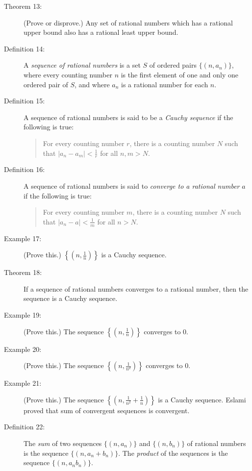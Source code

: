 \documentclass{article}
\begin{document}
\begin{description}
  \item[Theorem 13:] (Prove or disprove.) Any set of rational numbers which has a rational upper bound also has a rational least upper bound. 

  \item[Definition 14:] A \emph{sequence of rational numbers} is a set $S$ of ordered pairs $\{ (n, a_{n}) \}$, where every counting number $n$ is the first element of one and only one ordered pair of $S$, and where $a_{n}$ is a rational number for each $n$.

  \item[Definition 15:] A sequence of rational numbers is said to be a \emph{Cauchy sequence} if the following is true: 
    \begin{quote}
    For every counting number $r$, there is a counting number $N$ such that $|a_{n}-a_{m}| < \frac{1}{r}$ for all $n,m > N$.
    \end{quote}

  \item[Definition 16:] A sequence of rational numbers is said to \emph{converge to a rational number} $a$ if the following is true: 
    \begin{quote}
    For every counting number $m$, there is a counting number $N$ such that $|a_{n}-a| < \frac{1}{m}$ for all $n > N$.
    \end{quote}

  \item[Example 17:] (Prove this.) $\left\{ \left( n, \frac{1}{n} \right) \right\}$ is a Cauchy sequence. 

  \item[Theorem 18:] If a sequence of rational numbers converges to a rational number, then the sequence is a Cauchy sequence. 

  \item[Example 19:] (Prove this.) The sequence $\left\{ \left( n, \frac{1}{n} \right) \right\}$ converges to $0$. 

  \item[Example 20:] (Prove this.) The sequence $\left\{ \left( n, \frac{1}{n^{2}} \right) \right\}$ converges to $0$.

  \item[Example 21:] (Prove this.) The sequence $\left\{ \left( n, \frac{1}{n^{2}} + \frac{1}{n} \right) \right\}$ is a Cauchy sequence. Eslami proved that sum of convergent sequences is convergent.

  \item[Definition 22:] The \emph{sum} of two sequences $\{ (n, a_{n}) \}$ and $\{ (n, b_{n}) \}$ of rational numbers is the sequence $\{ (n, a_{n} + b_{n}) \}$. The \emph{product} of the sequences is the sequence $\{ (n, a_{n} b_{n}) \}$.


\end{description}
\end{document}
